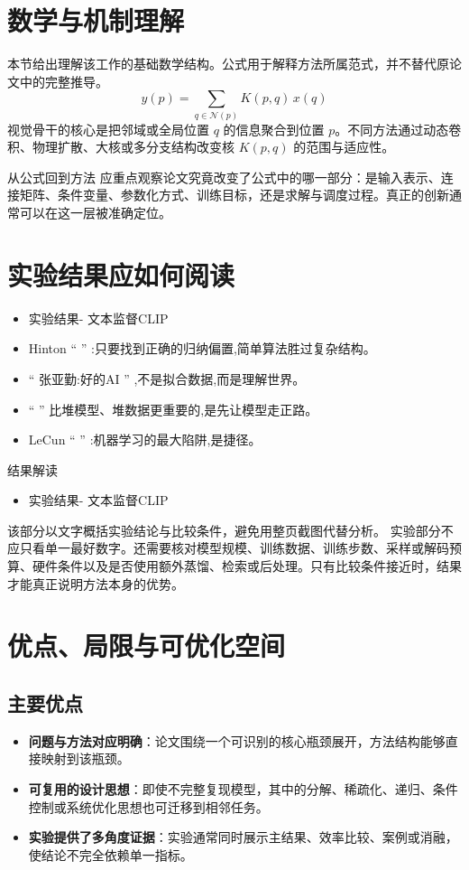 \documentclass[UTF8,11pt,a4paper]{ctexart}
\newcommand{\term}[1]{\textbf{\textcolor{mainblue}{#1}}}
\begin{document}
\section{数学与机制理解}
本节给出理解该工作的基础数学结构。公式用于解释方法所属范式，并不替代原论文中的完整推导。
\begin{equation}
y(p)=\sum_{q\in\mathcal N(p)}K(p,q)\,x(q)
\end{equation}
视觉骨干的核心是把邻域或全局位置 $q$ 的信息聚合到位置 $p$。不同方法通过动态卷积、物理扩散、大核或多分支结构改变核 $K(p,q)$ 的范围与适应性。

\begin{keybox}{从公式回到方法}
应重点观察论文究竟改变了公式中的哪一部分：是输入表示、连接矩阵、条件变量、参数化方式、训练目标，还是求解与调度过程。真正的创新通常可以在这一层被准确定位。
\end{keybox}


\section{实验结果应如何阅读}
\begin{itemize}
\item 实验结果- 文本监督CLIP
\item Hinton “ ” :只要找到正确的归纳偏置,简单算法胜过复杂结构。
\item “ 张亚勤:好的AI ” ,不是拟合数据,而是理解世界。
\item “ ” 比堆模型、堆数据更重要的,是先让模型走正路。
\item LeCun “ ” :机器学习的最大陷阱,是捷径。
\end{itemize}

\begin{notebox}{结果解读}
\begin{itemize}
\item 实验结果- 文本监督CLIP
\end{itemize}
\end{notebox}

该部分以文字概括实验结论与比较条件，避免用整页截图代替分析。
实验部分不应只看单一最好数字。还需要核对模型规模、训练数据、训练步数、采样或解码预算、硬件条件以及是否使用额外蒸馏、检索或后处理。只有比较条件接近时，结果才能真正说明方法本身的优势。

\section{优点、局限与可优化空间}
\subsection{主要优点}
\begin{itemize}
\item \term{问题与方法对应明确}：论文围绕一个可识别的核心瓶颈展开，方法结构能够直接映射到该瓶颈。
\item \term{可复用的设计思想}：即使不完整复现模型，其中的分解、稀疏化、递归、条件控制或系统优化思想也可迁移到相邻任务。
\item \term{实验提供了多角度证据}：实验通常同时展示主结果、效率比较、案例或消融，使结论不完全依赖单一指标。
\end{itemize}
\end{document}
